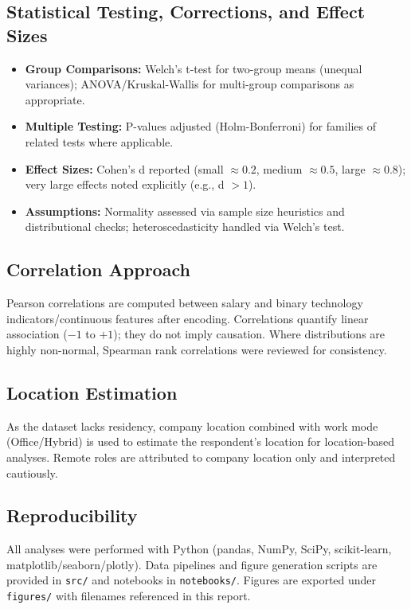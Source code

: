 \documentclass[12pt,a4paper]{article}
\begin{document}
\subsection{Statistical Testing, Corrections, and Effect Sizes}
\begin{itemize}
    \item \textbf{Group Comparisons:} Welch's t-test for two-group means (unequal variances); ANOVA/Kruskal-Wallis for multi-group comparisons as appropriate.
    \item \textbf{Multiple Testing:} P-values adjusted (Holm-Bonferroni) for families of related tests where applicable.
    \item \textbf{Effect Sizes:} Cohen's d reported (small \(\approx 0.2\), medium \(\approx 0.5\), large \(\approx 0.8\)); very large effects noted explicitly (e.g., d \(>1\)).
    \item \textbf{Assumptions:} Normality assessed via sample size heuristics and distributional checks; heteroscedasticity handled via Welch's test.
\end{itemize}

\subsection{Correlation Approach}
Pearson correlations are computed between salary and binary technology indicators\slash continuous features after encoding. Correlations quantify linear association (\(-1\) to \(+1\)); they do not imply causation. Where distributions are highly non-normal, Spearman rank correlations were reviewed for consistency.

\subsection{Location Estimation}
As the dataset lacks residency, company location combined with work mode (Office\slash Hybrid) is used to estimate the respondent's location for location-based analyses. Remote roles are attributed to company location only and interpreted cautiously.

\subsection{Reproducibility}
All analyses were performed with Python (pandas, NumPy, SciPy, scikit-learn, matplotlib/seaborn/plotly). Data pipelines and figure generation scripts are provided in \texttt{src/} and notebooks in \texttt{notebooks/}. Figures are exported under \texttt{figures/} with filenames referenced in this report.
\end{document}
